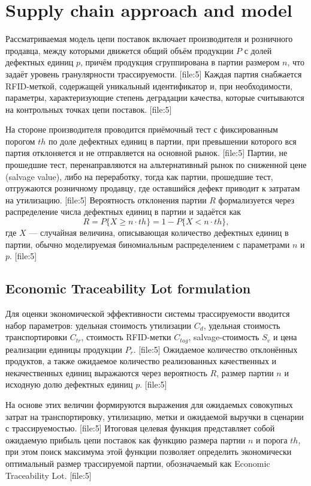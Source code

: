 \documentclass[eng]{ajceam-class}
\begin{document}
\section{Supply chain approach and model}

Рассматриваемая модель цепи поставок включает производителя и розничного продавца, между которыми движется общий объём продукции $P$ с долей дефектных единиц $p$, причём продукция сгруппирована в партии размером $n$, что задаёт уровень гранулярности трассируемости. [file:5] Каждая партия снабжается RFID\mbox{-}меткой, содержащей уникальный идентификатор и, при необходимости, параметры, характеризующие степень деградации качества, которые считываются на контрольных точках цепи поставок. [file:5]

На стороне производителя проводится приёмочный тест с фиксированным порогом $th$ по доле дефектных единиц в партии, при превышении которого вся партия отклоняется и не отправляется на основной рынок. [file:5] Партии, не прошедшие тест, перенаправляются на альтернативный рынок по сниженной цене (salvage value), либо на переработку, тогда как партии, прошедшие тест, отгружаются розничному продавцу, где оставшийся дефект приводит к затратам на утилизацию. [file:5] Вероятность отклонения партии $R$ формализуется через распределение числа дефектных единиц в партии и задаётся как
\begin{equation}
R = P\{ X \geq n \cdot th \} = 1 - P\{ X < n \cdot th \},
\end{equation}
где $X$ --- случайная величина, описывающая количество дефектных единиц в партии, обычно моделируемая биномиальным распределением с параметрами $n$ и $p$. [file:5]

\subsection{Economic Traceability Lot formulation}

Для оценки экономической эффективности системы трассируемости вводится набор параметров: удельная стоимость утилизации $C_d$, удельная стоимость транспортировки $C_{tr}$, стоимость RFID\mbox{-}метки $C_{tag}$, salvage\mbox{-}стоимость $S_v$ и цена реализации единицы продукции $P_r$. [file:5] Ожидаемое количество отклонённых продуктов, а также ожидаемое количество реализованных качественных и некачественных единиц выражаются через вероятность $R$, размер партии $n$ и исходную долю дефектных единиц $p$. [file:5]

На основе этих величин формируются выражения для ожидаемых совокупных затрат на транспортировку, утилизацию, метки и ожидаемой выручки в сценарии с трассируемостью. [file:5] Итоговая целевая функция представляет собой ожидаемую прибыль цепи поставок как функцию размера партии $n$ и порога $th$, при этом поиск максимума этой функции позволяет определить экономически оптимальный размер трассируемой партии, обозначаемый как Economic Traceability Lot. [file:5]
\end{document}
